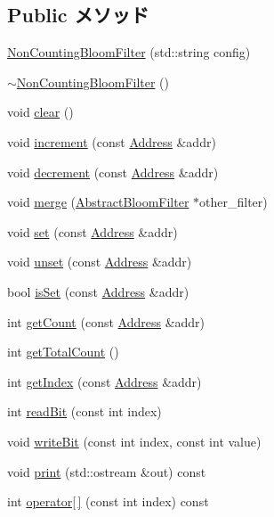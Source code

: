 \subsection*{Public メソッド}
\begin{DoxyCompactItemize}
\item 
\hyperlink{classNonCountingBloomFilter_a373173985101b10bc49bb32b18e82be7}{NonCountingBloomFilter} (std::string config)
\item 
\hyperlink{classNonCountingBloomFilter_aa35075e5fa499054bcac4cc5eebfb5e8}{$\sim$NonCountingBloomFilter} ()
\item 
void \hyperlink{classNonCountingBloomFilter_ac8bb3912a3ce86b15842e79d0b421204}{clear} ()
\item 
void \hyperlink{classNonCountingBloomFilter_a3e860ad851b771ac3b6eeb1716eb56bc}{increment} (const \hyperlink{classAddress}{Address} \&addr)
\item 
void \hyperlink{classNonCountingBloomFilter_addb6b805abb8328082a24926f2bf8c84}{decrement} (const \hyperlink{classAddress}{Address} \&addr)
\item 
void \hyperlink{classNonCountingBloomFilter_a4091f5f95de040d4e0ae5bd86817b13c}{merge} (\hyperlink{classAbstractBloomFilter}{AbstractBloomFilter} $\ast$other\_\-filter)
\item 
void \hyperlink{classNonCountingBloomFilter_a2b666fae2a5c2b98bc5cba8e1333bcc9}{set} (const \hyperlink{classAddress}{Address} \&addr)
\item 
void \hyperlink{classNonCountingBloomFilter_a69b772787ea61467af679e3aa5406b41}{unset} (const \hyperlink{classAddress}{Address} \&addr)
\item 
bool \hyperlink{classNonCountingBloomFilter_a4200ee289c3d941a4b209c4788f8087c}{isSet} (const \hyperlink{classAddress}{Address} \&addr)
\item 
int \hyperlink{classNonCountingBloomFilter_abb722634d5846105b673e9496df8d062}{getCount} (const \hyperlink{classAddress}{Address} \&addr)
\item 
int \hyperlink{classNonCountingBloomFilter_a97f66183ea41a7c123bab9dd5313a74a}{getTotalCount} ()
\item 
int \hyperlink{classNonCountingBloomFilter_a19f42f6f2fc3501021b768f0df8108b2}{getIndex} (const \hyperlink{classAddress}{Address} \&addr)
\item 
int \hyperlink{classNonCountingBloomFilter_a6f8a98d0f38a8d122d4cbf87323484eb}{readBit} (const int index)
\item 
void \hyperlink{classNonCountingBloomFilter_ac188318778d26b44f567c5b530598c16}{writeBit} (const int index, const int value)
\item 
void \hyperlink{classNonCountingBloomFilter_ac55fe386a101fbae38c716067c9966a0}{print} (std::ostream \&out) const 
\item 
int \hyperlink{classNonCountingBloomFilter_ad7ab71ad11e6bca06c3534af5707d8fc}{operator\mbox{[}$\,$\mbox{]}} (const int index) const 
\end{DoxyCompactItemize}
